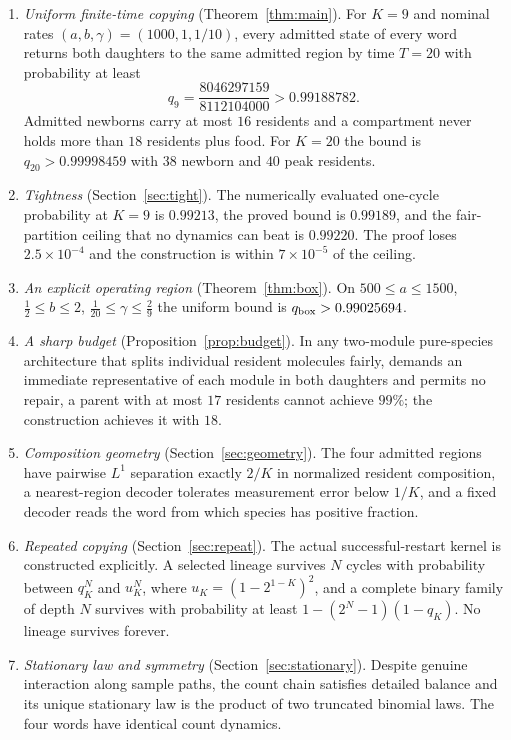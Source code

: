 \documentclass[11pt,a4paper]{article}
\theoremstyle{plain}
\theoremstyle{definition}
\theoremstyle{remark}
\begin{document}
\begin{enumerate}[label=(\roman*)]
\item \emph{Uniform finite-time copying} (Theorem~\ref{thm:main}). For $K=9$ and nominal rates $(a,b,\gamma)=(1000,1,1/10)$, every admitted state of every word returns both daughters to the same admitted region by time $T=20$ with probability at least
\[
 q_9=\frac{8046297159}{8112104000}>0.99188782 .
\]
Admitted newborns carry at most $16$ residents and a compartment never holds more than $18$ residents plus food. For $K=20$ the bound is $q_{20}>0.99998459$ with $38$ newborn and $40$ peak residents.
\item \emph{Tightness} (Section~\ref{sec:tight}). The numerically evaluated one-cycle probability at $K=9$ is $0.99213$, the proved bound is $0.99189$, and the fair-partition ceiling that no dynamics can beat is $0.99220$. The proof loses $2.5\times10^{-4}$ and the construction is within $7\times10^{-5}$ of the ceiling.
\item \emph{An explicit operating region} (Theorem~\ref{thm:box}). On $500\le a\le1500$, $\tfrac12\le b\le2$, $\tfrac1{20}\le\gamma\le\tfrac29$ the uniform bound is $q_{\rm box}>0.99025694$.
\item \emph{A sharp budget} (Proposition~\ref{prop:budget}). In any two-module pure-species architecture that splits individual resident molecules fairly, demands an immediate representative of each module in both daughters and permits no repair, a parent with at most $17$ residents cannot achieve $99\%$; the construction achieves it with $18$.
\item \emph{Composition geometry} (Section~\ref{sec:geometry}). The four admitted regions have pairwise $L^1$ separation exactly $2/K$ in normalized resident composition, a nearest-region decoder tolerates measurement error below $1/K$, and a fixed decoder reads the word from which species has positive fraction.
\item \emph{Repeated copying} (Section~\ref{sec:repeat}). The actual successful-restart kernel is constructed explicitly. A selected lineage survives $N$ cycles with probability between $q_K^N$ and $u_K^N$, where $u_K=(1-2^{1-K})^2$, and a complete binary family of depth $N$ survives with probability at least $1-(2^N-1)(1-q_K)$. No lineage survives forever.
\item \emph{Stationary law and symmetry} (Section~\ref{sec:stationary}). Despite genuine interaction along sample paths, the count chain satisfies detailed balance and its unique stationary law is the product of two truncated binomial laws. The four words have identical count dynamics.
\end{enumerate}
\end{document}
